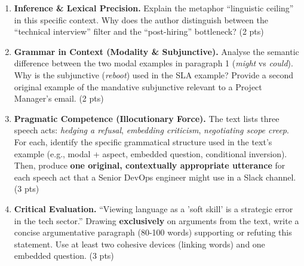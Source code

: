 \documentclass[11pt]{article}
\begin{document}
\begin{exercice}
\begin{enumerate}
    \item \textbf{Inference \& Lexical Precision.} 
    Explain the metaphor ``linguistic ceiling'' in this specific context. Why does the author distinguish between the ``technical interview'' filter and the ``post-hiring'' bottleneck? (2 pts)
    \item \textbf{Grammar in Context (Modality \& Subjunctive).} 
    Analyse the semantic difference between the two modal examples in paragraph 1 (\textit{might} vs \textit{could}). Why is the subjunctive (\textit{reboot}) used in the SLA example? Provide a second original example of the mandative subjunctive relevant to a Project Manager's email. (2 pts)
    \item \textbf{Pragmatic Competence (Illocutionary Force).} 
    The text lists three speech acts: \textit{hedging a refusal}, \textit{embedding criticism}, \textit{negotiating scope creep}. For each, identify the specific grammatical structure used in the text's example (e.g., modal + aspect, embedded question, conditional inversion). Then, produce \textbf{one original, contextually appropriate utterance} for each speech act that a Senior DevOps engineer might use in a Slack channel. (3 pts)
    \item \textbf{Critical Evaluation.} 
    ``Viewing language as a 'soft skill' is a strategic error in the tech sector.'' Drawing \textbf{exclusively} on arguments from the text, write a concise argumentative paragraph (80-100 words) supporting or refuting this statement. Use at least two cohesive devices (linking words) and one embedded question. (3 pts)
\end{enumerate}
\end{exercice}
\end{document}
